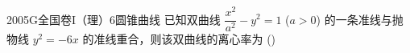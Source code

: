 
\begin{problem}{2005}{G}{全国卷I（理）}{6}{圆锥曲线}
已知双曲线 $ \dfrac{x^2}{a^2}-y^2=1 $ ($ a>0 $) 的一条准线与抛物线 $ y^2=-6x $ 的准线重合，则该双曲线的离心率为 (\hspace{1cm})
\begin{choices}
\end{choices}
\end{problem}

\begin{answer}

\end{answer}

\begin{solutions}

\end{solutions}